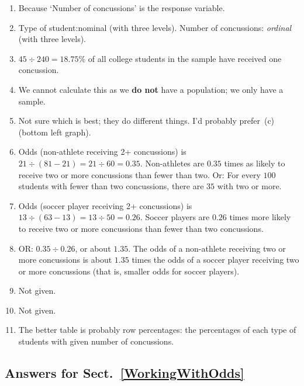 \documentclass[
  11pt,
  a4paper,
  krantz2]{krantz}
\providecommand{\tightlist}{%
  \setlength{\itemsep}{0pt}\setlength{\parskip}{0pt}}
\begin{document}
\begin{footnotesize}
\begin{enumerate}
\def\labelenumi{\arabic{enumi}.}
\tightlist
\item
  Because `Number of concussions' is the response variable.
\item
  Type of student:nominal (with three levels).
  Number of concussions: \emph{ordinal} (with three levels).
\item
  \(45\div 240 = 18.75\)\% of all college students in the sample have received one concussion.
\item
  We cannot calculate this as we \textbf{do not} have a population; we only have a sample.
\item
  Not sure which is best; they do different things.
  I'd probably prefer~(c) (bottom left graph).
\item
  Odds (non-athlete receiving 2+ concussions) is \(21\div(81 - 21) = 21\div 60 = 0.35\).
  Non-athletes are \(0.35\) times as likely to receive two or more concussions than fewer than two.
  Or: For every \(100\) students with fewer than two concussions, there are \(35\) with two or more.
\item
  Odds (soccer player receiving 2+ concussions) is \(13\div(63 - 13) = 13\div 50 = 0.26\).
  Soccer players are \(0.26\) times more likely to receive two or more concussions than fewer than two concussions.
\item
  OR: \(0.35 \div 0.26\), or about \(1.35\).
  The odds of a non-athlete receiving two or more concussions is about \(1.35\) times the odds of a soccer player receiving two or more concussions (that is, smaller odds for soccer players).
\item
  Not given.
\item
  Not given.
\item
  The better table is probably row percentages: the percentages of each type of students with given number of concussions.
\end{enumerate}

\subsection*{Answers for Sect.~\ref{WorkingWithOdds}}\label{answers-for-sect.-refworkingwithodds}


\end{footnotesize}
\end{document}
